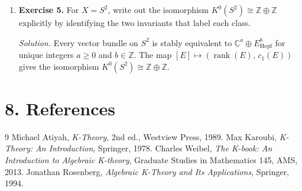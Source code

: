\begin{enumerate}[leftmargin=*,itemsep=0.9em]
\item \textbf{Exercise 5.} For $X=S^2$, write out the isomorphism $K^0(S^2)\cong\mathbb{Z}\oplus\mathbb{Z}$ explicitly by identifying the two invariants that label each class.

\emph{Solution.} Every vector bundle on $S^2$ is stably equivalent to $\underline{\mathbb{C}}^a\oplus E_{\mathrm{Hopf}}^b$ for unique integers $a\geq 0$ and $b\in\mathbb{Z}$. The map $[E]\mapsto(\operatorname{rank}(E),\,c_1(E))$ gives the isomorphism $K^0(S^2)\cong\mathbb{Z}\oplus\mathbb{Z}$.

\end{enumerate}
\section*{8. References}

\begin{thebibliography}{9}
 Michael Atiyah, \emph{K-Theory}, 2nd ed., Westview Press, 1989.
 Max Karoubi, \emph{K-Theory: An Introduction}, Springer, 1978.
 Charles Weibel, \emph{The K-book: An Introduction to Algebraic K-theory}, Graduate Studies in Mathematics 145, AMS, 2013.
 Jonathan Rosenberg, \emph{Algebraic K-Theory and Its Applications}, Springer, 1994.
\end{thebibliography}